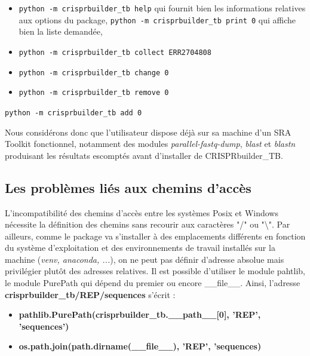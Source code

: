 \documentclass[twoside,a4paper,11pt,frenchb,openany]{report}
\begin{document}
\begin{itemize}
\item \texttt{python -m crisprbuilder\_tb \textemdash \textemdash help} qui fournit bien les informations relatives aux options du package,
\texttt{python -m crisprbuilder\_tb \textemdash \textemdash print 0} qui affiche bien la liste demandée,
\item \texttt{python -m crisprbuilder\_tb \textemdash \textemdash collect ERR2704808}
\item \texttt{python -m crisprbuilder\_tb \textemdash \textemdash change 0}
\item \texttt{python -m crisprbuilder\_tb \textemdash \textemdash remove 0}
\end{itemize}
\texttt{python -m crisprbuilder\_tb \textemdash \textemdash add 0}


Nous considérons donc que l'utilisateur dispose déjà sur sa machine d'un SRA Toolkit fonctionnel, notamment des modules \textit{parallel-fastq-dump}, \textit{blast} et \textit{blastn} produisant les résultats escomptés avant d'installer de CRISPRbuilder\_TB.



\subsection{Les problèmes liés aux chemins d'accès}

L'incompatibilité des chemins d'accès entre les systèmes Posix et Windows nécessite la définition des chemins sans recourir aux caractères "/" ou "\textbackslash". Par ailleurs, comme le package va s'installer à des emplacements différents en fonction du système d'exploitation et des environnements de travail installés sur la machine (\textit{venv, anaconda, ...}), on ne peut pas définir d'adresse absolue mais privilégier plutôt des adresses relatives. Il est possible d'utiliser le module pahtlib, le module PurePath qui dépend du premier ou encore \_\_file\_\_. Ainsi, l'adresse  \textbf{crisprbuilder\_tb/REP/sequences} s'écrit :
\begin{itemize}
\item \textbf{pathlib.PurePath(crisprbuilder\_tb.\_\_path\_\_[0], 'REP', 'sequences')}
\item \textbf{os.path.join(path.dirname(\_\_file\_\_), 'REP', 'sequences)}
\end{itemize}
\end{document}
